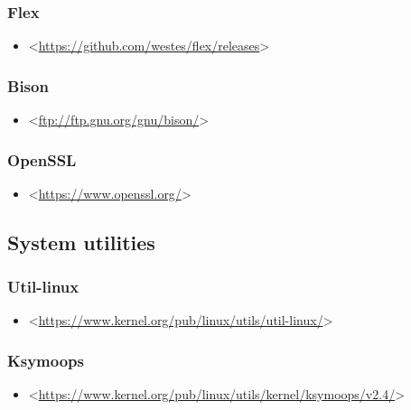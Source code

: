 \documentclass[a4paper,8pt,english]{sphinxmanual}
\begin{document}
\subsubsection{Flex}
\label{process/changes:id6}\begin{itemize}
\item {} 
\textless{}\href{https://github.com/westes/flex/releases}{https://github.com/westes/flex/releases}\textgreater{}

\end{itemize}


\subsubsection{Bison}
\label{process/changes:id7}\begin{itemize}
\item {} 
\textless{}\href{ftp://ftp.gnu.org/gnu/bison/}{ftp://ftp.gnu.org/gnu/bison/}\textgreater{}

\end{itemize}


\subsubsection{OpenSSL}
\label{process/changes:id8}\begin{itemize}
\item {} 
\textless{}\href{https://www.openssl.org/}{https://www.openssl.org/}\textgreater{}

\end{itemize}


\subsection{System utilities}
\label{process/changes:id9}

\subsubsection{Util-linux}
\label{process/changes:id10}\begin{itemize}
\item {} 
\textless{}\href{https://www.kernel.org/pub/linux/utils/util-linux/}{https://www.kernel.org/pub/linux/utils/util-linux/}\textgreater{}

\end{itemize}


\subsubsection{Ksymoops}
\label{process/changes:id11}\begin{itemize}
\item {} 
\textless{}\href{https://www.kernel.org/pub/linux/utils/kernel/ksymoops/v2.4/}{https://www.kernel.org/pub/linux/utils/kernel/ksymoops/v2.4/}\textgreater{}

\end{itemize}
\end{document}
